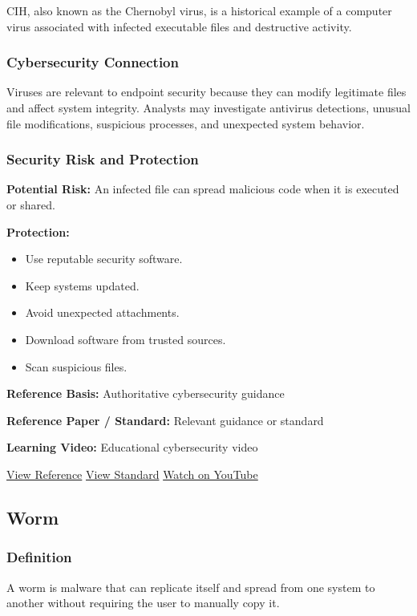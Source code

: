 \documentclass[12pt,a4paper]{article}
\newcommand{\refs}[3]{%
    \textbf{Reference Basis:} Authoritative cybersecurity guidance\par
    \textbf{Reference Paper / Standard:} Relevant guidance or standard\par
    \textbf{Learning Video:} Educational cybersecurity video\par
    \href{#1}{\textcolor{linkblue}{View Reference}}
    \quad
    \href{#2}{\textcolor{linkblue}{View Standard}}
    \quad
    \href{#3}{\textcolor{linkblue}{Watch on YouTube}}
}
\begin{document}
CIH, also known as the Chernobyl virus, is a historical example of a computer virus associated with infected executable files and destructive activity.

\subsubsection{Cybersecurity Connection}

Viruses are relevant to endpoint security because they can modify legitimate files and affect system integrity. Analysts may investigate antivirus detections, unusual file modifications, suspicious processes, and unexpected system behavior.

\subsubsection{Security Risk and Protection}

\textbf{Potential Risk:} An infected file can spread malicious code when it is executed or shared.

\textbf{Protection:}

\begin{itemize}
    \item Use reputable security software.
    \item Keep systems updated.
    \item Avoid unexpected attachments.
    \item Download software from trusted sources.
    \item Scan suspicious files.
\end{itemize}

\refs
{https://www.cisa.gov/news-events/news/malware}
{https://www.cisa.gov/news-events/news/malware}
{https://www.youtube.com/results?search_query=Professor+Messer+malware+virus}


\subsection{Worm}

\subsubsection{Definition}

A worm is malware that can replicate itself and spread from one system to another without requiring the user to manually copy it.
\end{document}
